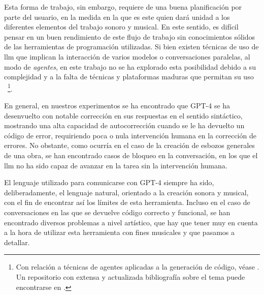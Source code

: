 Esta forma de trabajo, sin embargo, requiere de una buena planificación por parte del usuario, en la medida en la que es este quien dará unidad a los diferentes elementos del trabajo sonoro y musical. En este sentido, es difícil pensar en un buen rendimiento de este flujo de trabajo sin conocimientos sólidos de las herramientas de programación utilizadas. Si bien existen técnicas de uso de \gls{llm} que implican la interacción de varios modelos o conversaciones paralelas, al modo de \emph{agentes}, en este trabajo no se ha explorado esta posibilidad debido a su complejidad y a la falta de técnicas y plataformas maduras que permitan su uso ~\footnote{Con relación a técnicas de agentes aplicadas a la generación de código, véase \cite{huangAgentCoderMultiAgentbasedCode2023}. Un repositorio con extensa y actualizada bibliografía sobre el tema puede encontrarse en \cite{AGIEdgerunnersLLMAgentsPapers2024}.}.

En general, en nuestros experimentos se ha encontrado que GPT-4 se ha desenvuelto con notable corrección en sus respuestas en el sentido sintáctico, mostrando una alta capacidad de autocorrección cuando se le ha devuelto un código de error, requiriendo poca o nula intervención humana en la corrección de errores. No obstante, como ocurría en el caso de la creación de esbozos generales de una obra, se han encontrado casos de bloqueo en la conversación, en los que el \gls{llm} no ha sido capaz de avanzar en la tarea sin la intervención humana. 

El lenguaje utilizado para comunicarse con GPT-4 siempre ha sido, deliberadamente, el lenguaje natural, orientado a la creación sonora y musical, con el fin de encontrar así los límites de esta herramienta. Incluso en el caso de conversaciones en las que se devuelve código correcto y funcional, se han encontrado diversos problemas a nivel artístico, que hay que tener muy en cuenta a la hora de utilizar esta herramienta con fines musicales y que pasamos a detallar.


